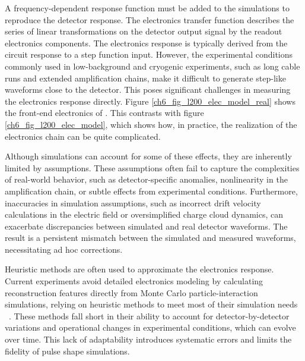 A frequency-dependent response function must be added to the simulations to reproduce the detector response. The electronics transfer function describes the series of linear transformations on the detector output signal by the readout electronics components. The electronics response is typically derived from the circuit response to a step function input. However, the experimental conditions commonly used in low-background and cryogenic experiments, such as long cable runs and extended amplification chains, make it difficult to generate step-like waveforms close to the detector. This poses significant challenges in measuring the electronics response directly. Figure \ref{ch6_fig_l200_elec_model_real} shows the front-end electronics of {\Ltwo}. This contrasts with figure \ref{ch6_fig_l200_elec_model}, which shows how, in practice, the realization of the electronics chain can be quite complicated.

Although simulations can account for some of these effects, they are inherently limited by assumptions. These assumptions often fail to capture the complexities of real-world behavior, such as detector-specific anomalies, nonlinearity in the amplification chain, or subtle effects from experimental conditions. Furthermore, inaccuracies in simulation assumptions, such as incorrect drift velocity calculations in the electric field or oversimplified charge cloud dynamics, can exacerbate discrepancies between simulated and real detector waveforms. The result is a persistent mismatch between the simulated and measured waveforms, necessitating ad hoc corrections. 

Heuristic methods are often used to approximate the electronics response. Current experiments avoid detailed electronics modeling by calculating reconstruction features directly from Monte Carlo particle-interaction simulations, relying on heuristic methods to meet most of their simulation needs ~\cite{Ben_Thesis,Sam_Thesis}. These methods fall short in their ability to account for detector-by-detector variations and operational changes in experimental conditions, which can evolve over time. This lack of adaptability introduces systematic errors and limits the fidelity of pulse shape simulations.

